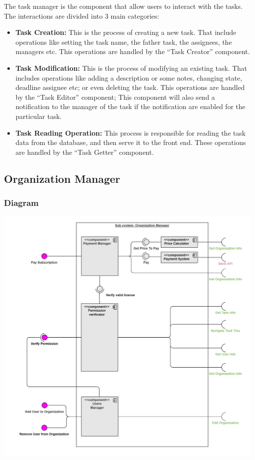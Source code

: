 \documentclass{article}
\begin{document}
The task manager is the component that allow users to interact with the tasks.
The interactions are divided into 3 main categories:
\begin{itemize}
    \item \textbf{Task Creation: }
    This is the process of creating a new task. That include operations like 
    setting the task name, the father task, the assignees, the managers etc.
    This operations are handled by the ``Task Creator'' component.
    \item \textbf{Task Modification: }
    This is the process of modifying an existing task. That includes operations like adding a description or some notes,
    changing state, deadline assignee etc; or even deleting the task.
    This operations are handled by the ``Task Editor'' component; This component will also send a notification to the manager of the task if the notification are enabled for the particular task.
    \item \textbf{Task Reading Operation: }
    This process is responsible for reading the task data from the database, and then serve it to the front end.
    These operations are handled by the ``Task Getter'' component.
\end{itemize}


\subsection{Organization Manager}
\subsubsection{Diagram}
\includegraphics[width=\textwidth,height=\textheight,keepaspectratio]{images/component_diagram/organization_manager.jpg}
\end{document}
